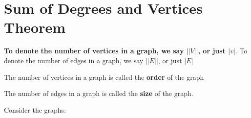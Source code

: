 \documentclass{report}
\begin{document}
    \bigbreak \noindent 
    \begin{center}
    \end{center}

    \pagebreak \bigbreak \noindent 
    \section{\LARGE Sum of Degrees and Vertices Theorem}
    \smallbreak \noindent
    \begin{definition}
    \textbf{To denote the number of vertices in a graph, we say $||V||$, or just $|v|$}. To denote the number of edges in a graph, we say $||E||$, or just $|E|$ 
    \end{definition}
    \smallbreak \noindent
    \begin{definition}
    The number of vertices in a graph is called the \textbf{order} of the graph
    \end{definition}
    \smallbreak \noindent
    \begin{definition}
     The number of edges in a graph is called the \textbf{size} of the graph.
    \end{definition}
    \bigbreak \noindent 
    Consider the graphs:
    \bigbreak \noindent 
\end{document}
